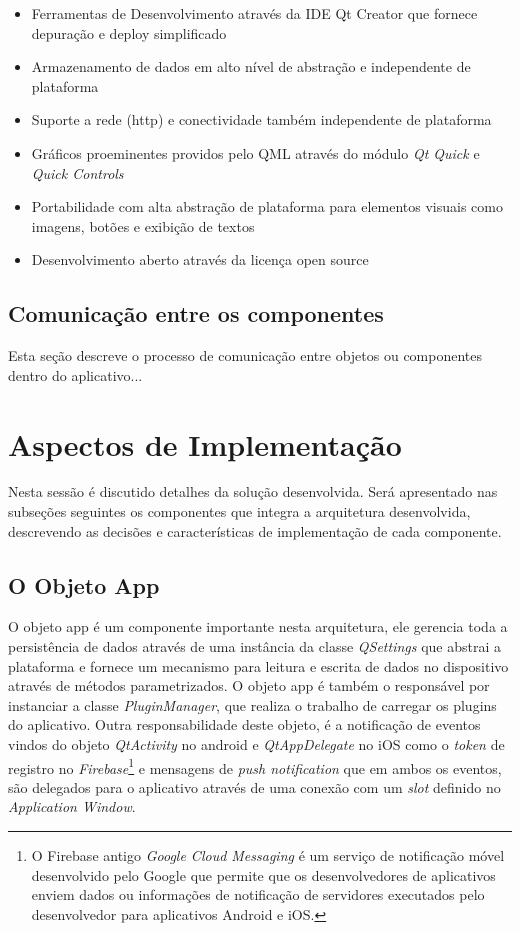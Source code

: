 \begin{itemize}
	\item Ferramentas de Desenvolvimento através da IDE Qt Creator que fornece depuração e deploy simplificado
	\item Armazenamento de dados em alto nível de abstração e independente de plataforma
	\item Suporte a rede (http) e conectividade também independente de plataforma
	\item Gráficos proeminentes providos pelo QML através do módulo \textit{Qt Quick} e \textit{Quick Controls}
	\item Portabilidade com alta abstração de plataforma para elementos visuais como imagens, botões e exibição de textos
	\item Desenvolvimento aberto através da licença open source
\end{itemize}

\subsection{Comunicação entre os componentes}
Esta seção descreve o processo de comunicação entre objetos ou componentes dentro do aplicativo...


\section{Aspectos de Implementação}\label{sec:solucao-desenvolvida}
Nesta sessão é discutido detalhes da solução desenvolvida. Será apresentado nas subseções seguintes os componentes que integra a arquitetura desenvolvida, descrevendo as decisões e características de implementação de cada componente.


\subsection{O Objeto App}\label{sec:solucao-desenvolvida}
O objeto app é um componente importante nesta arquitetura, ele gerencia toda a persistência de dados através de uma instância da classe \textit{QSettings} que abstrai a plataforma e fornece um mecanismo para leitura e escrita de dados no dispositivo através de métodos parametrizados. O objeto app é também o responsável por instanciar a classe \textit{PluginManager}, que realiza o trabalho de carregar os plugins do aplicativo. Outra responsabilidade deste objeto, é a notificação de eventos vindos do objeto \textit{QtActivity} no android e \textit{QtAppDelegate} no iOS como o \textit{token} de registro no \textit{Firebase}\footnote{O Firebase antigo \textit{Google Cloud Messaging} é um serviço de notificação móvel desenvolvido pelo Google que permite que os desenvolvedores de aplicativos enviem dados ou informações de notificação de servidores executados pelo desenvolvedor para aplicativos Android e iOS.} e mensagens de \textit{push notification} que em ambos os eventos, são delegados para o aplicativo através de uma conexão com um \textit{slot} definido no \textit{Application Window}.

